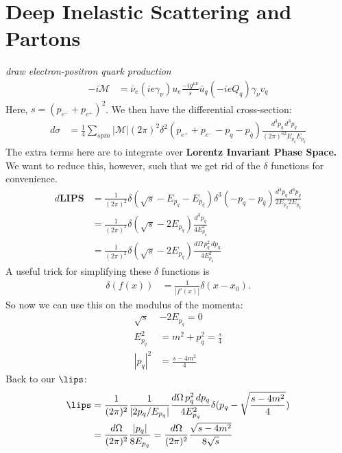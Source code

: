 \documentclass[relqm.tex]{subfiles}
\begin{document}
\chapter{Deep Inelastic Scattering and Partons}
\emph{draw electron-positron quark production}
\begin{align}
    -i\mathcal{M} &= \bar{\nu}_e(ie\gamma_\nu)u_e\frac{-ig^{\mu\nu}}{s}\bar{u}_q(-ieQ_{q})\gamma_\nu v_q
\end{align}
Here, $s = (p_{e^-} + p_{e^+})^2$. 
We then have the differential cross-section:
\begin{align}
    d\sigma &= \frac14\sum_{spin} |\mathcal{M}| (2\pi)^2 \delta^2(p_{e^+}+p_{e^-}-p_{q}-p_{\bar{q}}) \frac{d^3p_q\,d^3p_{\bar{q}}}{(2\pi)^62E_{p_q}E_{p_{\bar{q}}}}
\end{align}
The extra terms here are to integrate over \textbf{Lorentz Invariant Phase Space.}
We want to reduce this, however, such that we get rid of the $\delta$ functions for convenience. 
\begin{align}
    d\textbf{LIPS} &= \frac{1}{(2\pi)^2} \delta(\sqrt{s}-E_{p_q}-E_{p_{\bar{q}}})\delta^3(-p_{q}-p_{\bar{q}}) \frac{d^3p_q\,d^3p_{\bar{q}}}{2E_{p_q}2E_{p_{\bar{q}}}} \\
                 &= \frac{1}{(2\pi)^2} \delta(\sqrt{s}-2E_{p_q})\frac{d^3p_{q}}{4E_{p_q}^2} \\
                 &= \frac{1}{(2\pi)^2} \delta(\sqrt{s}-2E_{p_q})\frac{d\Omega\,p_q^2\,dp_q}{4E_{p_q}^2}
\end{align}
A useful trick for simplifying these $\delta$ functions is
\begin{align}
    \delta(f(x)) &= \frac{1}{|f'(x)|}\delta(x-x_0).
\end{align}
So now we can use this on the modulus of the momenta:
\begin{align}
    \sqrt{s} &- 2E_{p_q} = 0 \\
    E_{p_q}^2 &= m^2 + p_q^2 = \frac{s}{4} \\
    |p_q|^2 &= \frac{s-4m^2}{4}
\end{align}
Back to our $\lips$:
\begin{align}
    \lips &= \frac{1}{(2\pi)^2} \frac{1}{|2p_q/E_{p_q}|} \frac{d\Omega\, p_q^2\,dp_q}{4E_{p_q}^2} \delta(p_q-\sqrt{\frac{s-4m^2}{4}}) \\
          &= \frac{d\Omega}{(2\pi)^2}\frac{|p_q|}{8E_{p_q}} = \frac{d\Omega}{(2\pi)^2}\frac{\sqrt{s-4m^2}}{8\sqrt{s}}
\end{align}
\end{document}
